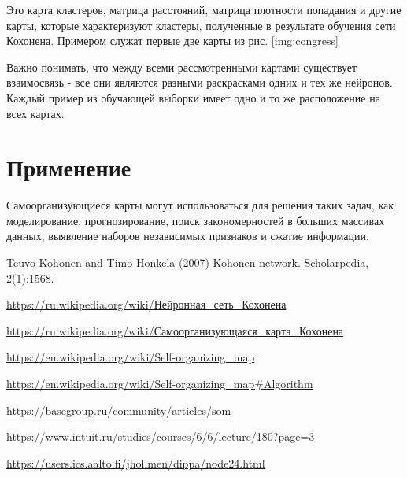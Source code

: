 \documentclass[a4paper,12pt]{article}
\begin{document}
Это карта кластеров, матрица расстояний, матрица плотности попадания и другие карты, которые характеризуют кластеры, полученные в результате обучения сети Кохонена. Примером служат первые две карты из рис. \ref{img:congress}

Важно понимать, что между всеми рассмотренными картами существует взаимосвязь - все они являются разными раскрасками одних и тех же нейронов. Каждый пример из обучающей выборки имеет одно и то же расположение на всех картах.\cite{intuit}

\section{Применение}

Самоорганизующиеся карты могут использоваться для решения таких задач, как моделирование, прогнозирование, поиск закономерностей в больших массивах данных, выявление наборов независимых признаков и сжатие информации.\cite{intuit}

\begin{thebibliography}{9}
    Teuvo Kohonen and Timo Honkela (2007)
    \href{http://www.scholarpedia.org/article/Kohonen_network}{Kohonen network}.
    \href{http://www.scholarpedia.org/}{Scholarpedia},
    2(1):1568.

    \href{https://ru.wikipedia.org/wiki/\%D0\%9D\%D0\%B5\%D0\%B9\%D1\%80\%D0\%BE\%D0\%BD\%D0\%BD\%D0\%B0\%D1\%8F\_\%D1\%81\%D0\%B5\%D1\%82\%D1\%8C\_\%D0\%9A\%D0\%BE\%D1\%85\%D0\%BE\%D0\%BD\%D0\%B5\%D0\%BD\%D0\%B0}
    {https://ru.wikipedia.org/wiki/Нейронная\_сеть\_Кохонена}

    \href{https://ru.wikipedia.org/wiki/\%D0\%A1\%D0\%B0\%D0\%BC\%D0\%BE\%D0\%BE\%D1\%80\%D0\%B3\%D0\%B0\%D0\%BD\%D0\%B8\%D0\%B7\%D1\%83\%D1\%8E\%D1\%89\%D0\%B0\%D1\%8F\%D1\%81\%D1\%8F_\%D0\%BA\%D0\%B0\%D1\%80\%D1\%82\%D0\%B0_\%D0\%9A\%D0\%BE\%D1\%85\%D0\%BE\%D0\%BD\%D0\%B5\%D0\%BD\%D0\%B0}
    {https://ru.wikipedia.org/wiki/Самоорганизующаяся\_карта\_Кохонена}

    \href{https://en.wikipedia.org/wiki/Self-organizing\_map}{https://en.wikipedia.org/wiki/Self-organizing\_map}

    \href{https://en.wikipedia.org/wiki/Self-organizing\_map\#Algorithm}
    {https://en.wikipedia.org/wiki/Self-organizing\_map\#Algorithm}

    \href{https://basegroup.ru/community/articles/som}{https://basegroup.ru/community/articles/som}

    \href{https://www.intuit.ru/studies/courses/6/6/lecture/180?page=3}{https://www.intuit.ru/studies/courses/6/6/lecture/180?page=3}
  
    \href{https://users.ics.aalto.fi/jhollmen/dippa/node24.html}{https://users.ics.aalto.fi/jhollmen/dippa/node24.html}
\end{thebibliography}
\end{document}
